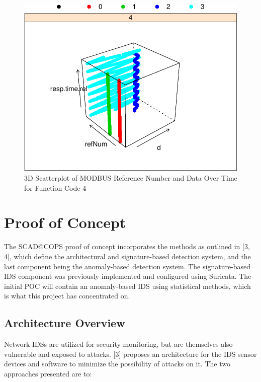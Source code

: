 \documentclass[11pt,a4paper]{article}
\begin{document}
\clearpage

\begin{figure}[h]

{\centering \includegraphics{thesis_files/figure-latex/unnamed-chunk-34-1} 

}

\caption{3D Scatterplot of MODBUS Reference Number
 and Data Over Time for Function Code 4}\label{fig:unnamed-chunk-34}
\end{figure}

\clearpage

\section{Proof of Concept}\label{proof-of-concept}

The SCAD@COPS proof of concept incorporates the methods as outlined in
{[}3, 4{]}, which define the architectural and signature-based detection
system, and the last component being the anomaly-based detection system.
The signature-based IDS component was previously implemented and
configured using Suricata. The initial POC will contain an anomaly-based
IDS using statistical methods, which is what this project has
concentrated on.

\subsection{Architecture Overview}\label{architecture-overview}

Network IDSs are utilized for security monitoring, but are themselves
also vulnerable and exposed to attacks. {[}3{]} proposes an architecture
for the IDS sensor devices and software to minimize the possibility of
attacks on it. The two approaches presented are to:
\end{document}
